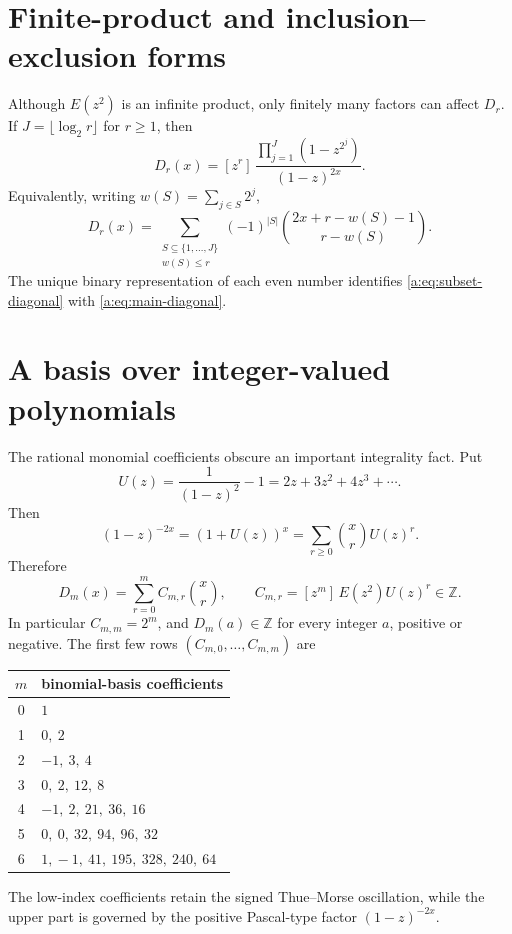 \documentclass[11pt,a4paper,oneside,openany]{book}
\numberwithin{equation}{chapter}
\theoremstyle{definition}
\theoremstyle{remark}
\newcommand{\Z}{\mathbb Z}
\newcommand{\TM}{E}
\newcommand{\coeff}[2]{[z^{#1}]\,#2}
\newcommand{\Diag}{D}
\begin{document}
\section{Finite-product and inclusion--exclusion forms}

Although \(E(z^2)\) is an infinite product, only finitely many factors can
affect \(\Diag_r\).  If \(J=\lfloor\log_2r\rfloor\) for \(r\ge1\), then
\begin{equation}
 \Diag_r(x)=
 \coeff{r}{
 \frac{\prod_{j=1}^{J}(1-z^{2^j})}{(1-z)^{2x}}}.
 \label{a:eq:finite-product-diagonal}
\end{equation}
Equivalently, writing \(w(S)=\sum_{j\in S}2^j\),
\begin{equation}
 \Diag_r(x)=
 \sum_{\substack{S\subseteq\{1,\ldots,J\}\\w(S)\le r}}
 (-1)^{|S|}
 \binom{2x+r-w(S)-1}{r-w(S)}.
 \label{a:eq:subset-diagonal}
\end{equation}
The unique binary representation of each even number identifies
\eqref{a:eq:subset-diagonal} with \eqref{a:eq:main-diagonal}.
\section{A basis over integer-valued polynomials}

The rational monomial coefficients obscure an important integrality fact.
Put
\[
 U(z)=\frac{1}{(1-z)^2}-1=2z+3z^2+4z^3+\cdots.
\]
Then
\[
 (1-z)^{-2x}=(1+U(z))^x
 =\sum_{r\ge0}\binom xrU(z)^r.
\]
Therefore
\begin{equation}
 \Diag_m(x)=\sum_{r=0}^{m}C_{m,r}\binom xr,
 \qquad
 C_{m,r}=\coeff{m}{\TM(z^2)U(z)^r}\in\Z.
 \label{b:eq:binomial-basis}
\end{equation}
In particular $C_{m,m}=2^m$, and $\Diag_m(a)\in\Z$ for every integer
$a$, positive or negative.  The first few rows $(C_{m,0},\ldots,C_{m,m})$
are
\begin{center}
\small
\begin{tabular}{c@{\qquad}l}
\toprule
$m$ & binomial-basis coefficients \\
\midrule
0 & $1$\\
1 & $0,\ 2$\\
2 & $-1,\ 3,\ 4$\\
3 & $0,\ 2,\ 12,\ 8$\\
4 & $-1,\ 2,\ 21,\ 36,\ 16$\\
5 & $0,\ 0,\ 32,\ 94,\ 96,\ 32$\\
6 & $1,\!-1,\ 41,\ 195,\ 328,\ 240,\ 64$\\
\bottomrule
\end{tabular}
\end{center}
The low-index coefficients retain the signed Thue--Morse oscillation, while
the upper part is governed by the positive Pascal-type factor
$(1-z)^{-2x}$.
\end{document}
